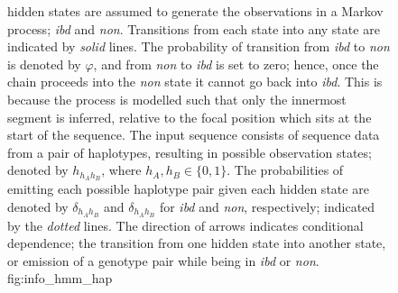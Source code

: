\begin{figure}[!htb]
%
{ hidden states are assumed to generate the observations in a Markov process; \emph{ibd} and \emph{non}.
Transitions from each state into any state are indicated by \emph{solid} lines.
The probability of transition from \emph{ibd} to \emph{non} is denoted by $\varphi$, and from \emph{non} to \emph{ibd} is set to zero; hence, once the chain proceeds into the \emph{non} state it cannot go back into \emph{ibd}.
This is because the process is modelled such that only the innermost segment is inferred, relative to the focal position which sits at the start of the sequence.
The input sequence consists of sequence data from a pair of haplotypes, resulting in  possible observation states; denoted by $h_{h_A h_B}$, where ${h_A,h_B \in \lbrace 0,1 \rbrace}$.
The probabilities of emitting each possible haplotype pair given each hidden state are denoted by $\delta_{h_A h_B}$ and $\delta_{h_A h_B}$ for \emph{ibd} and \emph{non}, respectively; indicated by the \emph{dotted} lines.
The direction of arrows indicates conditional dependence; \ie the transition from one hidden state into another state, or emission of a genotype pair while being in \emph{ibd} or \emph{non}.}%
{fig:info_hmm_hap}
\end{figure}
